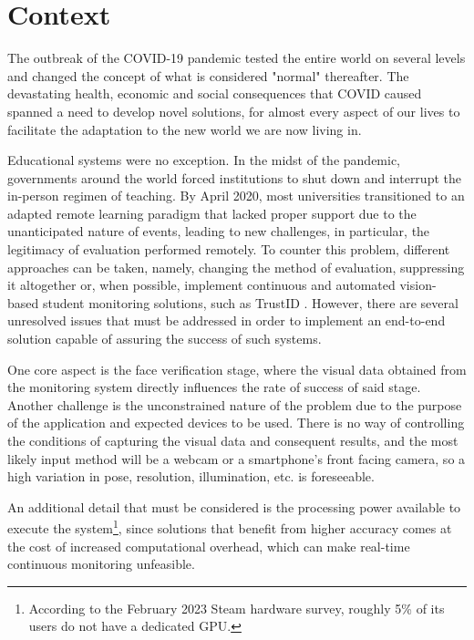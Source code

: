 \documentclass[class=report, crop=false, a4paper, 12pt]{standalone}
\begin{document}
\section{Context}
The outbreak of the COVID-19 pandemic tested the entire world on several levels and changed the concept of what is considered "normal" thereafter. The devastating health, economic and social consequences that COVID caused spanned a need to develop novel solutions, for almost every aspect of our lives to facilitate the adaptation to the new world we are now living in. 

\par Educational systems were no exception. In the midst of the pandemic, governments around the world forced institutions to shut down and interrupt the in-person regimen of teaching. By April 2020, most universities transitioned to an adapted remote learning paradigm \autocite{winsteadRemoteMicroelectronicsLaboratory2022} that lacked proper support due to the unanticipated nature of events, leading to new challenges, in particular, the legitimacy of evaluation performed remotely. To counter this problem, different approaches can be taken, namely, changing the method of evaluation, suppressing it altogether \autocite{barronrodriguezRemoteLearningGlobal2021} or, when possible, implement continuous and automated vision-based student monitoring solutions, such as TrustID \autocite{fariaImagebasedFaceVerification2023}. However, there are several unresolved issues that must be addressed in order to implement an end-to-end solution capable of assuring the success of such systems. 

\par One core aspect is the face verification stage, where the visual data obtained from the monitoring system directly influences the rate of success of said stage. Another challenge is the unconstrained nature of the problem due to the purpose of the application and expected devices to be used. There is no way of controlling the conditions of capturing the visual data and consequent results, and the most likely input method will be a webcam or a smartphone's front facing camera, so a high variation in pose, resolution, illumination, etc. is foreseeable. 

\par An additional detail that must be considered is the processing power available to execute the system\footnote{According to the February 2023 Steam hardware survey, roughly 5\% of its users do not have a dedicated GPU.}, since solutions that benefit from higher accuracy comes at the cost of increased computational overhead, which can make real-time continuous monitoring unfeasible.
\end{document}
